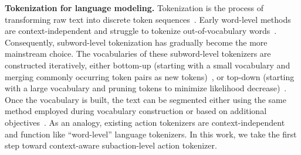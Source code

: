 \textbf{Tokenization for language modeling.} Tokenization is the process of transforming raw text into discrete token sequences~\cite{kudo2018sentencepiece}.
Early word-level methods are context-independent and struggle to tokenize out-of-vocabulary words~\cite{sutskever2014seq2seq,bahdanau2015word}. Consequently, subword-level tokenization has gradually become the more mainstream choice.
The vocabularies of these subword-level tokenizers are constructed iteratively, either bottom-up (starting with a small vocabulary and merging commonly occurring token pairs as new tokens)~\cite{wu2016wordpiece,sennrich2016bpe}, or top-down (starting with a large vocabulary and pruning tokens to minimize likelihood decrease)~\cite{kudo2018unigram,yehezkel2023sage}. Once the vocabulary is built, the text can be segmented either using the same method employed during vocabulary construction or based on additional objectives~\cite{he2020dpe,provilkov2020bpedropout,hofmann2022flota,schmidt2024pathpiece}. As an analogy, existing action tokenizers are context-independent and function like ``word-level'' language tokenizers. In this work, we take the first step toward context-aware subaction-level action tokenizer.
